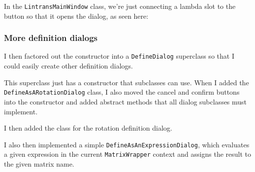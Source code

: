 \documentclass[../main.tex]{subfiles}
\begin{document}
In the \texttt{LintransMainWindow} class, we're just connecting a lambda slot to the button so that it opens the dialog, as seen here:


\subsubsection{More definition dialogs\label{development:initial-gui:more-definition-dialogs}}

I then factored out the constructor into a \texttt{DefineDialog} superclass so that I could easily create other definition dialogs.


This superclass just has a constructor that subclasses can use. When I added the \texttt{DefineAsARotationDialog} class, I also moved the cancel and confirm buttons into the constructor and added abstract methods that all dialog subclasses must implement.


I then added the class for the rotation definition dialog.



I also then implemented a simple \texttt{DefineAsAnExpressionDialog}, which evaluates a given expression in the current \texttt{MatrixWrapper} context and assigns the result to the given matrix name.

\end{document}
